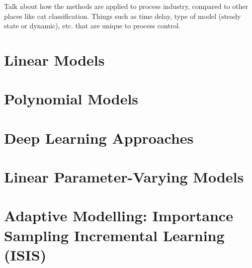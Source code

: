 %
% 

Talk about how the methods are applied to process industry, compared to other places like cat classification.  Things such as time delay, type of model (steady state or dynamic), etc. that are unique to process control.

\section{Linear Models}

\section{Polynomial Models}

\section{Deep Learning Approaches}

\section{Linear Parameter-Varying Models}

\section{Adaptive Modelling: Importance Sampling Incremental Learning (ISIS)}

